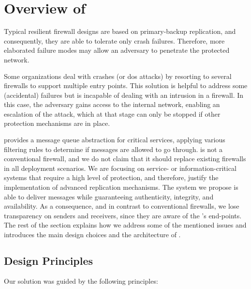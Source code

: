 \section{Overview of \sieveq}
\label{architecture}

Typical resilient firewall designs are based on primary-backup replication, and consequently, they are able to tolerate only crash failures.
Therefore, more elaborated failure modes may allow an adversary to penetrate the protected network.


Some organizations deal with crashes (or \gls{dos} attacks) by resorting to several firewalls to support multiple entry points. 
This solution is helpful to address some (accidental) failures but is incapable of dealing with an intrusion in a firewall.
In this case, the adversary gains access to the internal network, enabling an escalation of the attack, which at that stage can only be stopped if other protection mechanisms are in place.

\sieveq provides a message queue abstraction for critical services, applying various filtering rules to determine if messages are allowed to go through.
\sieveq is not a conventional firewall, and we do not claim that it should replace existing firewalls in all deployment scenarios.
We are focusing on service- or information-critical systems that require a high level of protection, and therefore, justify the implementation of advanced replication mechanisms.
The system we propose is able to deliver messages while guaranteeing authenticity, integrity, and availability.
As a consequence, and in contrast to conventional firewalls, we lose transparency on senders and receivers, since they are aware of the \sieveq's end-points.
The rest of the section explains how we address some of the mentioned issues and introduces the main design choices and the architecture of \sieveq.

\subsection{Design Principles}
Our solution was guided by the following  principles:


